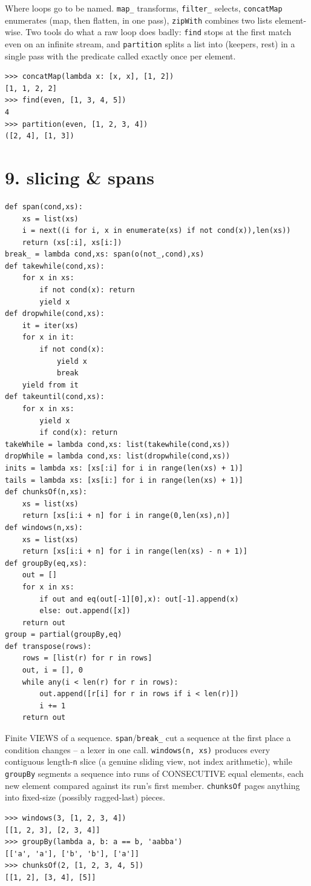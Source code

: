 \documentclass[10pt,letterpaper]{book}
\begin{document}
Where loops go to be named. \texttt{map\_} transforms, \texttt{filter\_} selects, \texttt{concatMap}
enumerates (map, then flatten, in one pass), \texttt{zipWith} combines two lists element-wise. Two
tools do what a raw loop does badly: \texttt{find} stops at the first match even on an infinite
stream, and \texttt{partition} splits a list into (keepers, rest) in a single pass with the predicate
called exactly once per element.
\begin{lstlisting}[style=ex]
>>> concatMap(lambda x: [x, x], [1, 2])
[1, 1, 2, 2]
>>> find(even, [1, 3, 4, 5])
4
>>> partition(even, [1, 2, 3, 4])
([2, 4], [1, 3])
\end{lstlisting}
\section*{9. slicing \& spans}
\begin{lstlisting}[style=code]
def span(cond,xs):
    xs = list(xs)
    i = next((i for i, x in enumerate(xs) if not cond(x)),len(xs))
    return (xs[:i], xs[i:])
break_ = lambda cond,xs: span(o(not_,cond),xs)
def takewhile(cond,xs):
    for x in xs:
        if not cond(x): return
        yield x
def dropwhile(cond,xs):
    it = iter(xs)
    for x in it:
        if not cond(x):
            yield x
            break
    yield from it
def takeuntil(cond,xs):
    for x in xs:
        yield x
        if cond(x): return
takeWhile = lambda cond,xs: list(takewhile(cond,xs))
dropWhile = lambda cond,xs: list(dropwhile(cond,xs))
inits = lambda xs: [xs[:i] for i in range(len(xs) + 1)]
tails = lambda xs: [xs[i:] for i in range(len(xs) + 1)]
def chunksOf(n,xs):
    xs = list(xs)
    return [xs[i:i + n] for i in range(0,len(xs),n)]
def windows(n,xs):
    xs = list(xs)
    return [xs[i:i + n] for i in range(len(xs) - n + 1)]
def groupBy(eq,xs):
    out = []
    for x in xs:
        if out and eq(out[-1][0],x): out[-1].append(x)
        else: out.append([x])
    return out
group = partial(groupBy,eq)
def transpose(rows):
    rows = [list(r) for r in rows]
    out, i = [], 0
    while any(i < len(r) for r in rows):
        out.append([r[i] for r in rows if i < len(r)])
        i += 1
    return out
\end{lstlisting}

Finite VIEWS of a sequence. \texttt{span}/\texttt{break\_} cut a sequence at the first place a
condition changes -- a lexer in one call. \texttt{windows(n, xs)} produces every contiguous
length-\texttt{n} slice (a genuine sliding view, not index arithmetic), while \texttt{groupBy}
segments a sequence into runs of CONSECUTIVE equal elements, each new element compared against its
run's first member. \texttt{chunksOf} pages anything into fixed-size (possibly ragged-last) pieces.
\begin{lstlisting}[style=ex]
>>> windows(3, [1, 2, 3, 4])
[[1, 2, 3], [2, 3, 4]]
>>> groupBy(lambda a, b: a == b, 'aabba')
[['a', 'a'], ['b', 'b'], ['a']]
>>> chunksOf(2, [1, 2, 3, 4, 5])
[[1, 2], [3, 4], [5]]
\end{lstlisting}
\end{document}

